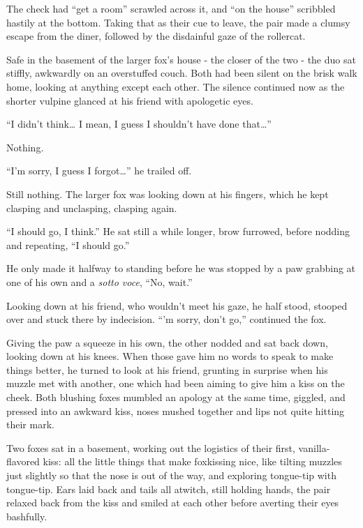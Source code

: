 The check had ``get a room'' scrawled across it, and ``on the house'' scribbled hastily at the bottom. Taking that as their cue to leave, the pair made a clumsy escape from the diner, followed by the disdainful gaze of the rollercat.

\secdiv{}

\noindent Safe in the basement of the larger fox's house - the closer of the two - the duo sat stiffly, awkwardly on an overstuffed couch. Both had been silent on the brisk walk home, looking at anything except each other. The silence continued now as the shorter vulpine glanced at his friend with apologetic eyes.

``I didn't think\ldots{} I mean, I guess I shouldn't have done that\ldots{}''

Nothing.

``I'm sorry, I guess I forgot\ldots{}'' he trailed off.

Still nothing. The larger fox was looking down at his fingers, which he kept clasping and unclasping, clasping again.

``I should go, I think.'' He sat still a while longer, brow furrowed, before nodding and repeating, ``I should go.''

He only made it halfway to standing before he was stopped by a paw grabbing at one of his own and a \emph{sotto voce}, ``No, wait.''

Looking down at his friend, who wouldn't meet his gaze, he half stood, stooped over and stuck there by indecision. ``'m sorry, don't go,'' continued the fox.

Giving the paw a squeeze in his own, the other nodded and sat back down, looking down at his knees. When those gave him no words to speak to make things better, he turned to look at his friend, grunting in surprise when his muzzle met with another, one which had been aiming to give him a kiss on the cheek. Both blushing foxes mumbled an apology at the same time, giggled, and pressed into an awkward kiss, noses mushed together and lips not quite hitting their mark.

Two foxes sat in a basement, working out the logistics of their first, vanilla-flavored kiss: all the little things that make foxkissing nice, like tilting muzzles just slightly so that the nose is out of the way, and exploring tongue-tip with tongue-tip. Ears laid back and tails all atwitch, still holding hands, the pair relaxed back from the kiss and smiled at each other before averting their eyes bashfully.

